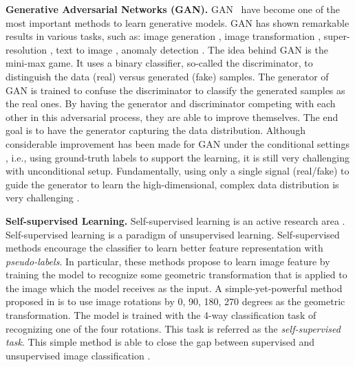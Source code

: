 \documentclass{article}
\begin{document}
{\bf Generative Adversarial Networks (GAN).} GAN~\cite{goodfellow-nisp-2014} have become one of the most important methods to learn generative models. GAN has shown remarkable results in various tasks, such as: image generation \cite{karras-iclr-2018,brock-iclr-2018,karras-cvpr-2019}, image transformation \cite{isola-cvpr-2017, zhu-cvpr-2017}, super-resolution \cite{ledig-cvpr-2017}, text to image \cite{reed-arxiv-2016,zhang2-cvpr-2017}, anomaly detection \cite{schlegl-ipmi-2017,lim-icdm-2018}. The idea behind GAN is the mini-max game. It uses a binary classifier, so-called the discriminator, to distinguish the data (real) versus generated (fake) samples. 
The generator of GAN is trained to confuse the discriminator to classify the generated samples as the real ones. 
By having the generator and discriminator competing with each other in this adversarial process, they are able to improve themselves. The end goal is to have the generator capturing  
the data distribution. Although considerable improvement has been made for GAN under the conditional settings \cite{odena-icml-2017,zhang-arxiv-2018,brock-iclr-2018}, i.e., using ground-truth labels to support the learning, it is still very challenging with unconditional setup. Fundamentally, using only a single signal (real/fake) to guide the generator to learn the high-dimensional, complex data distribution is very challenging \cite{goodfellow-nips-2016,arjovsky-arxiv-2017a,che-arxiv-2016,chen-arxiv-2016,metz-arxiv-2016,salimans-nisp-2016}.


{\bf Self-supervised Learning.}
Self-supervised learning is an active research area \cite{doersch-cvpr-2015,pathak-cvpr-2016,zhang-eccv-2016,zhang1-cvpr-2017,noroozi-iccv-2017,gidaris-iclr-2018}. Self-supervised learning is a paradigm of unsupervised learning.
Self-supervised methods
encourage the classifier to learn better feature representation with {\em pseudo-labels}. In particular, these methods propose to learn image feature by training the model to recognize some geometric transformation that is applied to the image which the model receives as the input.
A simple-yet-powerful method proposed in \cite{gidaris-iclr-2018}
is to use image rotations by 0, 90, 180, 270 degrees as the geometric transformation.
The model is trained with the 4-way classification task of  recognizing one of the four rotations. This task is referred as 
the {\em self-supervised task}. This simple method is able to close the gap between supervised and unsupervised image classification \cite{gidaris-iclr-2018}. 
\end{document}
